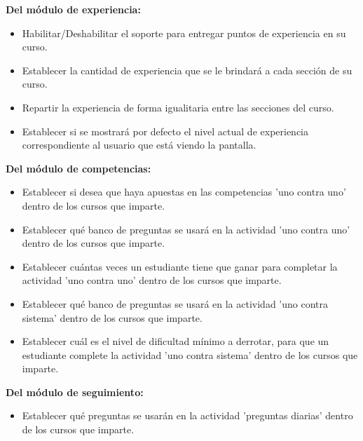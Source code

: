     {\bf Del módulo de experiencia:}
        \begin{itemize}
        \item Habilitar/Deshabilitar el soporte para entregar puntos de experiencia
              en su curso.
        \item Establecer la cantidad de experiencia que se le brindará a cada
              sección de su curso.
        \item Repartir la experiencia de forma igualitaria entre las secciones del
              curso.
        \item Establecer si se mostrará por defecto el nivel actual de experiencia
              correspondiente al usuario que está viendo la pantalla.
        \end{itemize}


    {\bf Del módulo de competencias:}
        \begin{itemize}
        \item Establecer si desea que haya apuestas en las competencias 'uno contra uno' dentro de los cursos que imparte.
        \item Establecer qué banco de preguntas se usará en la actividad 'uno contra uno' dentro de los cursos que imparte.
        \item Establecer cuántas veces un estudiante tiene que ganar para completar la actividad 'uno contra uno' dentro de los cursos que imparte.
        \item Establecer qué banco de preguntas se usará en la actividad 'uno contra sistema' dentro de los cursos que imparte.
        \item Establecer cuál es el nivel de dificultad mínimo a derrotar, para que un estudiante complete la actividad 'uno contra sistema' dentro de los cursos que imparte.
        \end{itemize}


    {\bf Del módulo de seguimiento:}
        \begin{itemize}
        \item Establecer qué preguntas se usarán en la actividad 'preguntas diarias' dentro de los cursos que imparte.
        \end{itemize}


